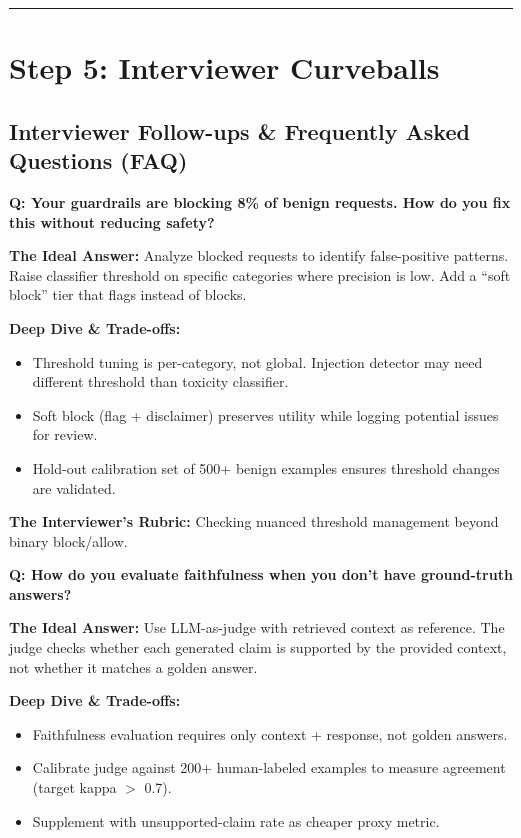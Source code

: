 \bigskip\hrule\bigskip

\section*{Step 5: Interviewer Curveballs}

\subsection*{Interviewer Follow-ups \& Frequently Asked Questions (FAQ)}

\textbf{Q: Your guardrails are blocking 8\% of benign requests. How do you fix this without reducing safety?}

\textbf{The Ideal Answer:} Analyze blocked requests to identify false-positive patterns. Raise classifier threshold on specific categories where precision is low. Add a ``soft block'' tier that flags instead of blocks.

\textbf{Deep Dive \& Trade-offs:}
\begin{itemize}
  \item Threshold tuning is per-category, not global. Injection detector may need different threshold than toxicity classifier.
  \item Soft block (flag + disclaimer) preserves utility while logging potential issues for review.
  \item Hold-out calibration set of 500+ benign examples ensures threshold changes are validated.
\end{itemize}

\textbf{The Interviewer's Rubric:} Checking nuanced threshold management beyond binary block/allow.

\textbf{Q: How do you evaluate faithfulness when you don't have ground-truth answers?}

\textbf{The Ideal Answer:} Use LLM-as-judge with retrieved context as reference. The judge checks whether each generated claim is supported by the provided context, not whether it matches a golden answer.

\textbf{Deep Dive \& Trade-offs:}
\begin{itemize}
  \item Faithfulness evaluation requires only context + response, not golden answers.
  \item Calibrate judge against 200+ human-labeled examples to measure agreement (target kappa $>$ 0.7).
  \item Supplement with unsupported-claim rate as cheaper proxy metric.
\end{itemize}

